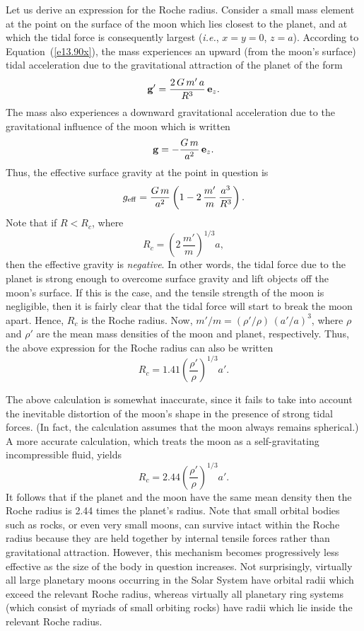 Let us derive an expression for the Roche radius. Consider a small mass
element at the point on the surface of the moon which lies closest to the planet, and at which the
tidal force is consequently largest ({\em i.e.}, $x=y=0$, $z=a$).  According to Equation~(\ref{e13.90x}), the
mass experiences an upward (from the moon's surface) tidal acceleration due to the gravitational attraction of the planet of the form
\begin{equation}
{\bf g}' = \frac{2\,G\,m'\,a}{R^3}\,{\bf e}_z.
\end{equation}
The mass also experiences a downward gravitational acceleration due to the gravitational influence of the moon
which is written
\begin{equation}
{\bf g} = - \frac{G\,m}{a^2}\,{\bf e}_z.
\end{equation}
Thus, the effective surface gravity at the point in question is
\begin{equation}
g_{\rm eff} = \frac{G\,m}{a^2}\left(1- 2\,\frac{m'}{m}\,\frac{a^3}{R^3}\right).
\end{equation}
Note that if $R< R_c$, where
\begin{equation}
R_c = \left(2\,\frac{m'}{m}\right)^{1/3} a,
\end{equation}
then the effective  gravity is {\em negative}. In other words, the
tidal force  due to the planet is strong enough to overcome surface gravity and  lift objects off the moon's surface. 
If this is the case, and the tensile strength of the moon is negligible,
then it is fairly clear that the tidal force will start to break the moon apart. Hence, $R_c$ is the Roche radius. Now,
$m'/m = (\rho'/\rho)\,(a'/a)^3$, where $\rho$ and $\rho'$ are the mean
mass densities of the moon and planet, respectively. Thus, the 
above expression for the Roche radius  can also be written
\begin{equation}
R_c = 1.41\left(\frac{\rho'}{\rho}\right)^{1/3} a'.
\end{equation}

The above calculation is somewhat inaccurate, since it fails to take into
account the  inevitable distortion of  the moon's shape in the presence of strong tidal
forces. (In fact, the calculation assumes that the moon
always remains spherical.) A more accurate calculation, which treats the moon
as a self-gravitating incompressible fluid, yields
\begin{equation}
R_c = 2.44\left(\frac{\rho'}{\rho}\right)^{1/3} a'.
\end{equation}
It follows that if the planet and the moon have the same mean
density then the Roche radius is 2.44 times the planet's radius. Note that small orbital bodies such as rocks, or even
very small moons,  can survive intact within the Roche radius because they
are held together by internal tensile forces rather than gravitational attraction.
However, this mechanism becomes progressively less effective as the size
of the body in question increases. Not surprisingly, virtually all large planetary moons
occurring  in  the Solar System have orbital radii which exceed the relevant Roche radius,
whereas virtually all planetary ring systems (which consist of myriads of small orbiting rocks)
have radii which 
lie inside the relevant Roche radius. 

